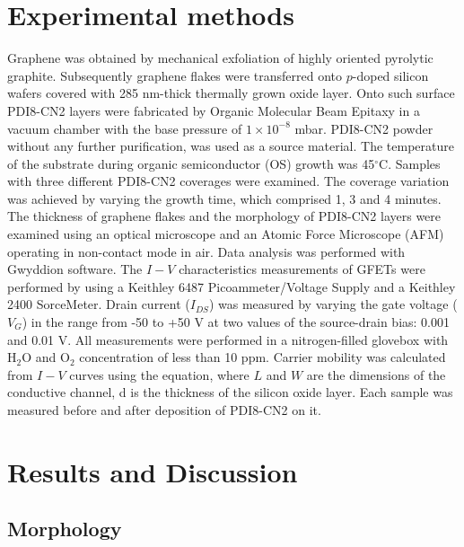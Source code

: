 \documentclass[preprint,aip,jap]{revtex4-2}
\begin{document}
\section{\label{sec:exper}Experimental methods}


Graphene was obtained by mechanical exfoliation of highly oriented pyrolytic graphite.
 Subsequently graphene flakes were transferred onto $p$-doped silicon wafers covered with 285 nm-thick thermally grown oxide layer.
 Onto such surface PDI8-CN2 layers were fabricated by Organic Molecular Beam Epitaxy in a vacuum chamber with the base pressure of $1\times10^{-8}$ mbar.
 PDI8-CN2 powder without any further purification, was used as a source material.
 The temperature of the substrate during organic semiconductor (OS) growth was 45$^\circ$C.
 Samples with three different PDI8-CN2 coverages were examined.
 The coverage variation was achieved by varying the growth time, which comprised 1, 3 and 4 minutes.
 The thickness of graphene flakes and the morphology of PDI8-CN2 layers were examined using an optical microscope and an Atomic Force Microscope (AFM) operating in non-contact mode in air.
 Data analysis was performed with Gwyddion software\cite{necas-2012}.
 The $I-V$ characteristics measurements of GFETs were performed by using a Keithley 6487 Picoammeter/Voltage Supply and a Keithley 2400 SorceMeter.
 Drain current ($I_{DS}$) was measured by varying the gate voltage ($V_G$) in the range from -50 to +50 V at two values of the source-drain bias: 0.001 and 0.01 V.
 All measurements were performed in a nitrogen-filled glovebox with H$_2$O and O$_2$ concentration of less than 10 ppm.
  Carrier mobility was calculated from $I-V$ curves using the equation, where $L$ and $W$ are the dimensions of the conductive channel, d is the thickness of the silicon oxide layer.
 Each sample was measured before and after deposition of PDI8-CN2 on it.


\section{\label{sec:res}Results and Discussion}

\subsection{\label{sec:morph}Morphology}
\end{document}

